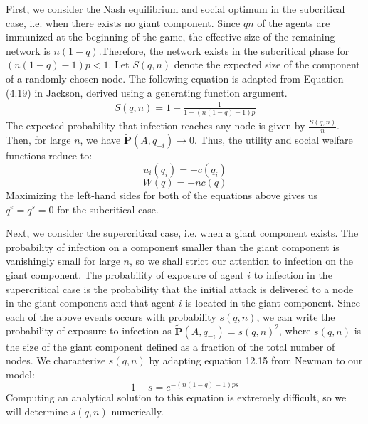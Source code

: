 \documentclass{article}
\theoremstyle{plain}
\begin{document}
First, we consider the Nash equilibrium and social optimum in the subcritical case, i.e. when there exists no giant component. Since $qn$ of the agents are immunized at the beginning of the game, the effective size of the remaining network is $n(1-q)$.Therefore, the network exists in the subcritical phase for $(n(1-q)-1)p < 1$. Let $S(q, n)$ denote the expected size of the component of a randomly chosen node. The following equation is adapted from Equation (4.19) in Jackson, derived using a generating function argument.
\begin{eqnarray}
	S(q, n) = 1 + \frac{1}{1 - (n(1-q)-1)p}
\end{eqnarray}
The expected probability that infection reaches any node is given by $\frac{S(q, n)}{n}$. Then, for large $n$, we have $\tilde{\textbf{P}}(A,q_{-i}) \rightarrow 0$. Thus, the utility and social welfare functions reduce to:
\begin{equation}
	u_i(q_i) = -c(q_i)
\end{equation}
\begin{equation}
	W(q) = -nc(q)
\end{equation}
Maximizing the left-hand sides for both of the equations above gives us $q^e = q^s = 0$ for the subcritical case. 

Next, we consider the supercritical case, i.e. when a giant component exists. The probability of infection on a component smaller than the giant component is vanishingly small for large $n$, so we shall strict our attention to infection on the giant component. The probability of exposure of agent $i$ to infection in the supercritical case is the probability that the initial attack is delivered to a node in the giant component and that agent $i$ is located in the giant component. Since each of the above events occurs with probability $s(q, n)$, we can write the probability of exposure to infection as $\tilde{\textbf{P}}(A,q_{-i}) = s(q, n)^2$, where $s(q, n)$ is the size of the giant component defined as a fraction of the total number of nodes. We characterize $s(q, n)$ by adapting equation 12.15 from Newman to our model:
\begin{equation}
	1 - s = e^{-(n(1-q)-1)ps}
\end{equation}
Computing an analytical solution to this equation is extremely difficult, so we will determine $s(q, n)$ numerically. 
\end{document}
